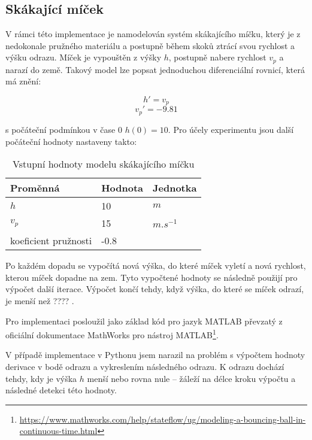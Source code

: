 \subsection{Skákající míček}
V rámci této implementace je namodelován systém skákajícího míčku, který je z nedokonale pružného materiálu a postupně během skoků ztrácí svou rychlost a výšku odrazu. Míček je vypouštěn z výšky $h$, postupně nabere rychlost $v_p$ a narazí do země. Takový model lze popsat jednoduchou diferenciální rovnicí, která má znění:

\begin{equation}
    h' = v_p
\end{equation}
\begin{equation}
    v_p ' = -9.81
\end{equation}

s počáteční podmínkou v čase 0 $h(0) = 10$. Pro účely experimentu jsou další počáteční hodnoty nastaveny takto:

\begin{center}
\begin{table}[ht]
    \centering
\begin{tabular}{|l|l|l|}
\hline
Proměnná             & Hodnota & Jednotka    \\ \hline
$h$                    &   10     & $m$     \\ \hline
$v_p$                   &    15   & $m.s^{-1}$ \\ \hline
koeficient pružnosti &  -0.8    &             \\ \hline
\end{tabular}
    \caption{Vstupní hodnoty modelu skákajícího míčku}
    \label{tab:micek-hodnoty}
\end{table}
\end{center}

Po každém dopadu se vypočítá nová výška, do které míček vyletí a nová rychlost, kterou míček dopadne na zem. Tyto vypočtené hodnoty se následně použijí pro výpočet další iterace. Výpočet končí tehdy, když výška, do které se míček odrazí, je menší než ???? . 

Pro implementaci posloužil jako základ kód pro jazyk MATLAB převzatý z oficiální dokumentace MathWorks pro nástroj MATLAB\footnote{\url{https://www.mathworks.com/help/stateflow/ug/modeling-a-bouncing-ball-in-continuous-time.html}}. 


V případě implementace v Pythonu jsem narazil na problém s výpočtem hodnoty derivace v bodě odrazu a vykreslením následného odrazu. K odrazu dochází tehdy, kdy je výška $h$ menší nebo rovna nule -- žáleží na délce kroku výpočtu a následné detekci této hodnoty.


